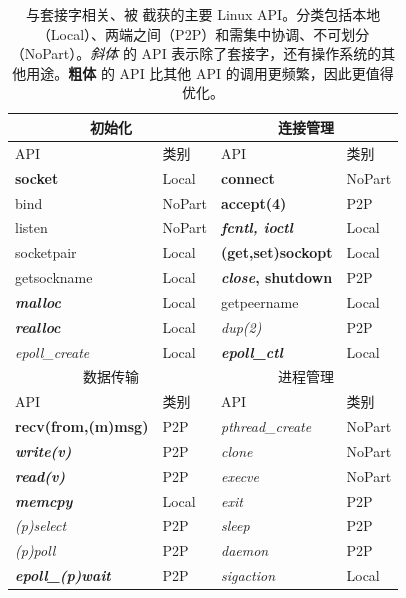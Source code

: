 \begin{table}[htbp]
	\centering
	\small
	\begin{tabular}{ll|ll}
		\toprule
		\multicolumn{2}{c|}{初始化} &
		\multicolumn{2}{c}{连接管理} \\
		\midrule
		API & 类别 &
		API & 类别 \\
		\midrule
		\textbf{socket} & Local &
		\textbf{connect} & NoPart \\

		bind & NoPart &
		\textbf{accept(4)} & P2P \\

		listen & NoPart &
		\textbf{\textit{fcntl, ioctl}} & Local \\

		socketpair & Local &
		\textbf{(get,set)sockopt} & Local \\

		getsockname  & Local &
		\textbf{\textit{close}, shutdown} & P2P \\

		\textbf{\textit{malloc}} & Local &
		getpeername & Local \\

		\textbf{\textit{realloc}} & Local &
		\textit{dup(2)} & P2P  \\

		\textit{epoll\_create} & Local &
		\textbf{\textit{epoll\_ctl}} & Local \\
		\bottomrule
		\toprule
		\multicolumn{2}{c|}{数据传输} &
		\multicolumn{2}{c}{进程管理} \\
		\midrule
		API & 类别 &
		API & 类别 \\
		\midrule
		\textbf{recv(from,(m)msg)} & P2P &
		\textit{pthread\_create} & NoPart \\

		\textbf{\textit{write(v)}} & P2P &
		\textit{clone} & NoPart \\

		\textbf{\textit{read(v)}} & P2P &
		\textit{execve} & NoPart \\

		\textbf{\textit{memcpy}} & Local &
		\textit{exit} & P2P \\

		\textit{(p)select} & P2P &
		\textit{sleep} & P2P \\

		\textit{(p)poll} & P2P &
		\textit{daemon} & P2P \\

		\textbf{\textit{epoll\_(p)wait}} & P2P &
		\textit{sigaction} & Local \\
		\bottomrule
	\end{tabular}
	\caption{与套接字相关、被 \libipc{} 截获的主要 Linux API。分类包括本地（Local）、两端之间（P2P）和需集中协调、不可划分（NoPart）。\textit{斜体} 的 API 表示除了套接字，还有操作系统的其他用途。\textbf{粗体} 的 API 比其他 API 的调用更频繁，因此更值得优化。}
	\label{socksdirect:tab:socket-api}
\end{table}



